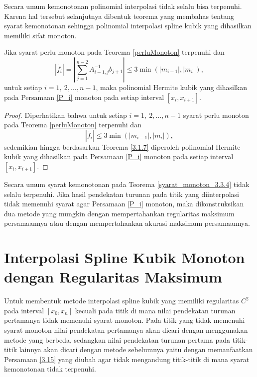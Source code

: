 Secara umum kemonotonan polinomial interpolasi tidak selalu bisa terpenuhi. Karena hal tersebut selanjutnya dibentuk teorema yang membahas tentang syarat kemonotonan sehingga polinomial interpolasi spline kubik yang dihasilkan memiliki sifat monoton.

\begin{teorema}\label{syarat_monoton_3.3.4}
    Jika syarat perlu monoton pada Teorema \ref{perluMonoton} terpenuhi dan
    \begin{equation*}
        |\dot{f_i}|=|\sum_{j=1}^{n-2}A_{i-1,j}^{-1}b_{j+1}|\leq3\min(|m_{i-1}|,|m_i|),
    \end{equation*}
    untuk setiap $i=1,~2,\dots,n-1$, maka polinomial Hermite kubik yang dihasilkan pada Persamaan  \eqref{P_i} monoton pada setiap interval $[x_i,x_{i+1}]$.
\end{teorema}

\begin{proof}
     Diperhatikan bahwa untuk setiap $i=1,~2,\dots,n-1$ syarat perlu monoton pada Teorema \ref{perluMonoton} terpenuhi dan $$|\dot{f_i}|\leq3\min(|m_{i-1}|,|m_i|),$$ sedemikian hingga berdasarkan Teorema \ref{3.1.7} diperoleh polinomial Hermite kubik yang dihasilkan pada Persamaan \eqref{P_i} monoton pada setiap interval $[x_i,x_{i+1}]$.
\end{proof}

Secara umum syarat kemonotonan pada Teorema \ref{syarat_monoton_3.3.4} tidak selalu terpenuhi. Jika hasil pendekatan turunan pada titik yang diinterpolasi tidak memenuhi syarat agar Persamaan \eqref{P_i} monoton, maka dikonstruksikan dua metode yang mungkin dengan mempertahankan regularitas maksimum persamaannya atau dengan mempertahankan akurasi maksimum persamaannya.

\section{Interpolasi Spline Kubik Monoton dengan Regularitas Maksimum}\label{4.2}

Untuk membentuk metode interpolasi spline kubik  yang memiliki regularitas $C^2$ pada interval $[x_0,x_n]$ kecuali pada titik di mana nilai pendekatan turunan pertamanya tidak memenuhi syarat monoton. Pada titik yang tidak memenuhi syarat monoton nilai pendekatan pertamanya akan dicari dengan menggunakan metode yang berbeda, sedangkan nilai pendekatan turunan pertama pada titik-titik lainnya akan dicari dengan metode sebelumnya yaitu dengan memanfaatkan Persamaan \eqref{3.15} yang diubah agar tidak mengandung titik-titik di mana syarat kemonotonan tidak terpenuhi.


